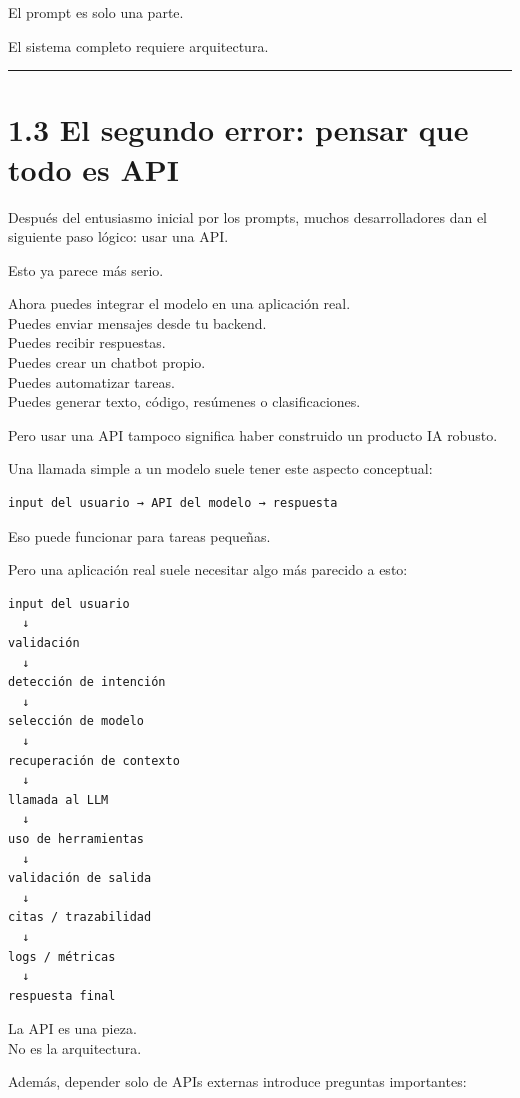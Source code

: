 El prompt es solo una parte.

El sistema completo requiere arquitectura.

\begin{center}\rule{0.5\linewidth}{0.5pt}\end{center}

\section{1.3 El segundo error: pensar que todo es
API}\label{el-segundo-error-pensar-que-todo-es-api}

Después del entusiasmo inicial por los prompts, muchos desarrolladores
dan el siguiente paso lógico: usar una API.

Esto ya parece más serio.

Ahora puedes integrar el modelo en una aplicación real.\\
Puedes enviar mensajes desde tu backend.\\
Puedes recibir respuestas.\\
Puedes crear un chatbot propio.\\
Puedes automatizar tareas.\\
Puedes generar texto, código, resúmenes o clasificaciones.

Pero usar una API tampoco significa haber construido un producto IA
robusto.

Una llamada simple a un modelo suele tener este aspecto conceptual:

\begin{lstlisting}
input del usuario → API del modelo → respuesta
\end{lstlisting}

Eso puede funcionar para tareas pequeñas.

Pero una aplicación real suele necesitar algo más parecido a esto:

\begin{lstlisting}
input del usuario
  ↓
validación
  ↓
detección de intención
  ↓
selección de modelo
  ↓
recuperación de contexto
  ↓
llamada al LLM
  ↓
uso de herramientas
  ↓
validación de salida
  ↓
citas / trazabilidad
  ↓
logs / métricas
  ↓
respuesta final
\end{lstlisting}

La API es una pieza.\\
No es la arquitectura.

Además, depender solo de APIs externas introduce preguntas importantes:

